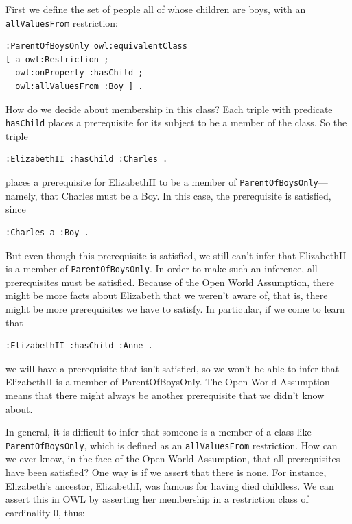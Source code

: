 First we define the set of people all of whose children are boys, with
an \texttt{allValuesFrom}
restriction:

\begin{lstlisting}
:ParentOfBoysOnly owl:equivalentClass
[ a owl:Restriction ;
  owl:onProperty :hasChild ;
  owl:allValuesFrom :Boy ] .
\end{lstlisting}

How do we decide about membership in this class? Each triple with
predicate \texttt{hasChild} places a prerequisite for its subject to be a member
of the class. So the triple

\begin{lstlisting}
:ElizabethII :hasChild :Charles .
\end{lstlisting}

places a prerequisite for ElizabethII to be a member of
\texttt{ParentOfBoysOnly}---namely, that
Charles must be a Boy. In this case, the prerequisite is satisfied, since

\begin{lstlisting}
:Charles a :Boy .
\end{lstlisting}


But even though this prerequisite is satisfied, we still can't infer
that ElizabethII is a member of \texttt{ParentOfBoysOnly}. In order to make such
an inference, all prerequisites must be satisfied. Because of the Open
World Assumption, there might be more facts about Elizabeth that we
weren't
aware of, that is, there might be more prerequisites we have to satisfy.
In particular, if we come to learn that

\begin{lstlisting}
:ElizabethII :hasChild :Anne .
\end{lstlisting}

we will have a prerequisite that isn't satisfied, so we won't be able to
infer that ElizabethII is a member of ParentOfBoysOnly. The Open World
Assumption means that there might always be another prerequisite that we
didn't know about.

In general, it is difficult to infer that someone is a member of a class
like \texttt{ParentOfBoysOnly}, which is defined as an \texttt{allValuesFrom} restriction.
How can we ever know, in the face of the Open World Assumption, that all
prerequisites have been satisfied? One way is if we assert that there is
none. For instance, Elizabeth's ancestor, ElizabethI, was famous for
having died childless. We can assert this in OWL by asserting her
membership in a restriction class of cardinality 0, thus:

